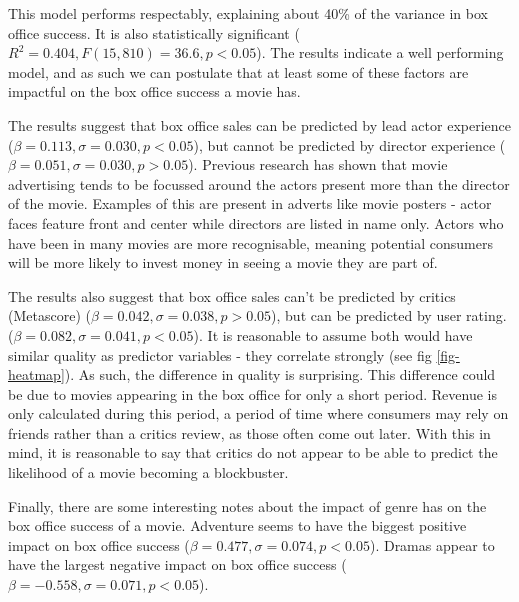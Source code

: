         \begin{multicols}{2}
            This model performs respectably, explaining about 40\% of the variance in box
                office success.
            It is also statistically significant ($R^2=0.404, F(15,810)=36.6, p<0.05$).
            The results indicate a well performing model, and as such we can postulate that
                at least some of these factors are impactful on the box office success a movie
                has.

            The results suggest that box office sales can be predicted by lead actor
                experience ($\beta=0.113, \sigma=0.030, p<0.05$), but cannot be predicted by
                director experience ($\beta=0.051, \sigma=0.030, p>0.05$).
            Previous research has shown that movie advertising tends to be focussed around
                the actors present more than the director of the movie\cite{elberse2007power}.
            Examples of this are present in adverts like movie posters - actor faces
                feature front and center while directors are listed in name only.
            Actors who have been in many movies are more recognisable, meaning potential
                consumers will be more likely to invest money in seeing a movie they are part
                of.

            The results also suggest that box office sales can't be predicted by critics
                (Metascore) ($\beta=0.042, \sigma=0.038, p>0.05$), but can be predicted by user
                rating.
            ($\beta=0.082, \sigma=0.041, p<0.05$).
            It is reasonable to assume both would have similar quality as predictor
                variables - they correlate strongly (see fig \ref{fig-heatmap}).
            As such, the difference in quality is surprising.
            This difference could be due to movies appearing in the box office for only a
                short period.
            Revenue is only calculated during this period, a period of time where consumers
                may rely on friends rather than a critics review, as those often come out
                later.
            With this in mind, it is reasonable to say that critics do not appear to be
                able to predict the likelihood of a movie becoming a blockbuster.

            Finally, there are some interesting notes about the impact of genre has on the
                box office success of a movie.
            Adventure seems to have the biggest positive impact on box office success
                ($\beta=0.477,\sigma=0.074,p<0.05$).
            Dramas appear to have the largest negative impact on box office success
                ($\beta=-0.558,\sigma=0.071,p<0.05$).
        \end{multicols}


